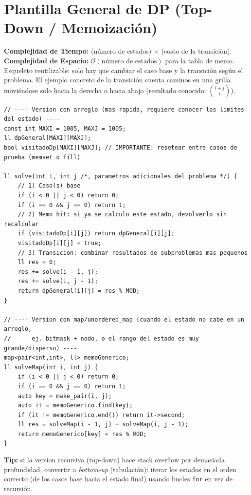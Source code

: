 \documentclass[10pt,twocolumn,letterpaper]{report}
\begin{document}
\section{Plantilla General de DP (Top-Down / Memoización)}
\textbf{Complejidad de Tiempo:} (número de estados) $\times$ (costo de la transición). \\
\textbf{Complejidad de Espacio:} $\mathcal{O}(\text{número de estados})$ para la tabla de memo. \\
Esqueleto reutilizable: solo hay que cambiar el caso base y la transición según el problema. El ejemplo concreto de la transición cuenta caminos en una grilla moviéndose solo hacia la derecha o hacia abajo (resultado conocido: $\binom{i+j}{i}$).
\begin{lstlisting}
// ---- Version con arreglo (mas rapida, requiere conocer los limites del estado) ----
const int MAXI = 1005, MAXJ = 1005;
ll dpGeneral[MAXI][MAXJ];
bool visitadoDp[MAXI][MAXJ]; // IMPORTANTE: resetear entre casos de prueba (memset o fill)

ll solve(int i, int j /*, parametros adicionales del problema */) {
    // 1) Caso(s) base
    if (i < 0 || j < 0) return 0;
    if (i == 0 && j == 0) return 1;
    // 2) Memo hit: si ya se calculo este estado, devolverlo sin recalcular
    if (visitadoDp[i][j]) return dpGeneral[i][j];
    visitadoDp[i][j] = true;
    // 3) Transicion: combinar resultados de subproblemas mas pequenos
    ll res = 0;
    res += solve(i - 1, j);
    res += solve(i, j - 1);
    return dpGeneral[i][j] = res % MOD;
}

// ---- Version con map/unordered_map (cuando el estado no cabe en un arreglo,
//      ej. bitmask + nodo, o el rango del estado es muy grande/disperso) ----
map<pair<int,int>, ll> memoGenerico;
ll solveMap(int i, int j) {
    if (i < 0 || j < 0) return 0;
    if (i == 0 && j == 0) return 1;
    auto key = make_pair(i, j);
    auto it = memoGenerico.find(key);
    if (it != memoGenerico.end()) return it->second;
    ll res = solveMap(i - 1, j) + solveMap(i, j - 1);
    return memoGenerico[key] = res % MOD;
}
\end{lstlisting}
\textbf{Tip:} si la version recursiva (top-down) hace stack overflow por demasiada profundidad, convertir a \textit{bottom-up} (tabulación): iterar los estados en el orden correcto (de los casos base hacia el estado final) usando bucles \texttt{for} en vez de recursión.
\end{document}
